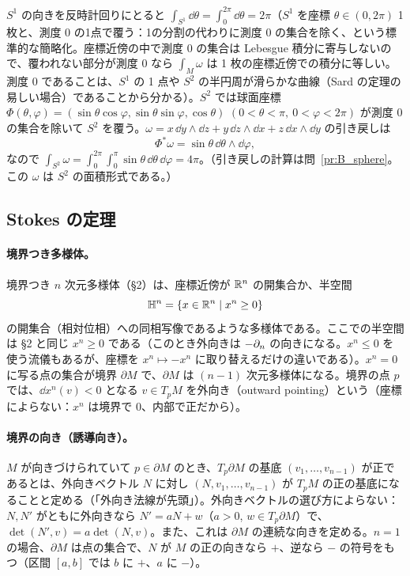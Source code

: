 \begin{ex}[$S^1$ と $S^2$]\label{B:ex:intex}
$S^1$ の向きを反時計回りにとると $\int_{S^1}\dd\theta=\int_0^{2\pi}\dd\theta=2\pi$（$S^1$ を座標 $\theta\in(0,2\pi)$ 1枚と、測度 $0$ の1点で覆う：1の分割の代わりに測度 $0$ の集合を除く、という標準的な簡略化。座標近傍の中で測度 $0$ の集合は Lebesgue 積分に寄与しないので、覆われない部分が測度 $0$ なら $\int_M\omega$ は 1 枚の座標近傍での積分に等しい。測度 $0$ であることは、$S^1$ の 1 点や $S^2$ の半円周が滑らかな曲線（Sard の定理の易しい場合）であることから分かる）。$S^2$ では球面座標 $\Phi(\theta,\varphi)=(\sin\theta\cos\varphi,\sin\theta\sin\varphi,\cos\theta)$ $(0<\theta<\pi,\ 0<\varphi<2\pi)$ が測度 $0$ の集合を除いて $S^2$ を覆う。$\omega=x\,\dd y\wedge\dd z+y\,\dd z\wedge\dd x+z\,\dd x\wedge\dd y$ の引き戻しは
\[
\Phi^*\omega=\sin\theta\,\dd\theta\wedge\dd\varphi ,
\]
なので $\int_{S^2}\omega=\int_0^{2\pi}\!\!\int_0^\pi\sin\theta\,\dd\theta\,\dd\varphi=4\pi$。（引き戻しの計算は問~\ref{pr:B_sphere}。この $\omega$ は $S^2$ の面積形式である。）
\end{ex}

\subsection{Stokes の定理}\label{B:ss:stokes}

\paragraph{境界つき多様体。}境界つき $n$ 次元多様体（§2）は、座標近傍が $\mathbb R^n$ の開集合か、半空間
\[
\mathbb H^n=\{x\in\mathbb R^n\mid x^n\ge0\}
\]
の開集合（相対位相）への同相写像であるような多様体である。ここでの半空間は §2 と同じ $x^n\ge0$ である（このとき外向きは $-\partial_n$ の向きになる。$x^n\le0$ を使う流儀もあるが、座標を $x^n\mapsto-x^n$ に取り替えるだけの違いである）。$x^n=0$ に写る点の集合が境界 $\partial M$ で、$\partial M$ は $(n-1)$ 次元多様体になる。境界の点 $p$ では、$\dd x^n(v)<0$ となる $v\in T_pM$ を外向き（outward pointing）という（座標によらない：$x^n$ は境界で $0$、内部で正だから）。

\paragraph{境界の向き（誘導向き）。}$M$ が向きづけられていて $p\in\partial M$ のとき、$T_p\partial M$ の基底 $(v_1,\dots,v_{n-1})$ が正であるとは、外向きベクトル $N$ に対し $(N,v_1,\dots,v_{n-1})$ が $T_pM$ の正の基底になることと定める（「外向き法線が先頭」）。外向きベクトルの選び方によらない：$N,N'$ がともに外向きなら $N'=aN+w$（$a>0$, $w\in T_p\partial M$）で、$\det(N',v)=a\det(N,v)$。また、これは $\partial M$ の連続な向きを定める。$n=1$ の場合、$\partial M$ は点の集合で、$N$ が $M$ の正の向きなら $+$、逆なら $-$ の符号をもつ（区間 $[a,b]$ では $b$ に $+$、$a$ に $-$）。


